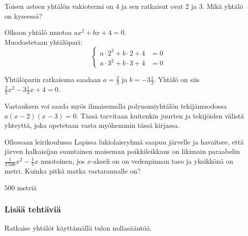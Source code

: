 \begin{tehtavasivu}
\begin{tehtava}
    Toisen asteen yhtälön vakiotermi on 4 ja sen ratkaisut ovat 2 ja 3. Mikä yhtälö on kyseessä?

    \begin{vastaus}
		Olkoon yhtälö muotoa $ax^2+bx+4=0$. \\      
      Muodostetaan yhtälöpari:
      \[
        \left\{
          \begin{aligned}
            a\cdot 2^2 + b\cdot 2 + 4 &= 0 \\
            a\cdot 3^2 + b\cdot 3 + 4 &= 0
          \end{aligned}
        \right.
      \]
      
      Yhtälöparin ratkaisuna saadaan $a=\frac23$ ja $b=-3\frac13$. Yhtälö on siis $\frac{2}{3}x^2-3\frac{1}{3}x+4=0$.
      
      Vastauksen voi saada myös ilmaisemalla polynomiyhtälön tekijämuodossa $a(x-2)(x-3)=0$. Tässä tarvitaan kuitenkin juurten ja tekijöiden välistä yhteyttä, joka opetetaan vasta myöhemmin tässä kirjassa.
    \end{vastaus}
\end{tehtava}

\begin{tehtava}
Ollessaan leirikoulussa Lapissa lukiolaisryhmä saapuu järvelle ja havaitsee, että järven halkaisijan suuntainen maiseman poikkileikkaus on likimain paraabelin $\frac{1}{2\,500}x^2-\frac{1}{5}x$ muotoinen, jos $x$-akseli on on vedenpinnan taso ja yksikkönä on metri. Kuinka pitkä matka vastarannalle on?
\begin{vastaus}
$500$ metriä
\end{vastaus}
\end{tehtava}

\subsubsection*{Lisää tehtäviä}

\begin{tehtava}
    Ratkaise yhtälöt käyttämällä tulon nollasääntöä.
    \begin{alakohdat}
    \end{alakohdat}
    \begin{vastaus}
        \begin{alakohdat}
        \end{alakohdat}
    \end{vastaus}
\end{tehtava}


\end{tehtavasivu}
